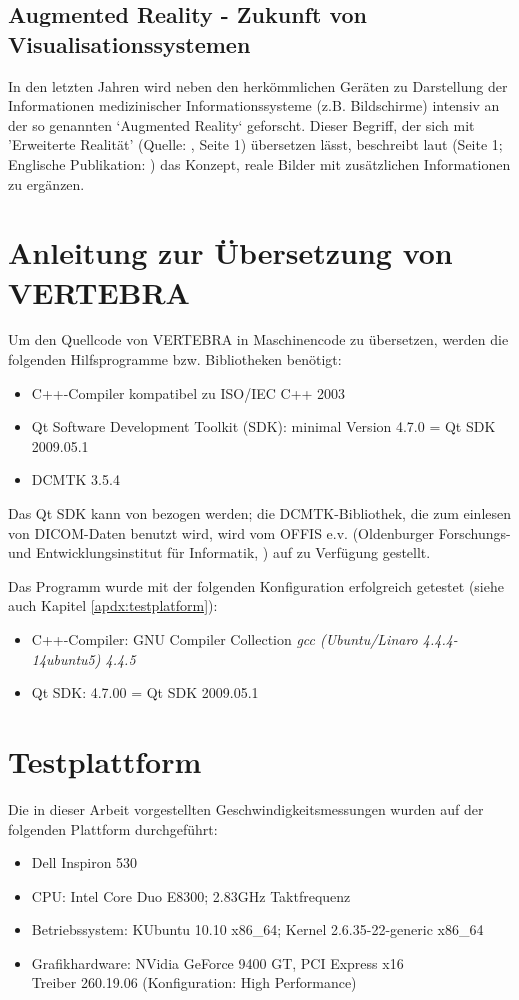 \documentclass[a4paper]{scrartcl}
\begin{document}
\subsection{Augmented Reality - Zukunft von Visualisationssystemen}\label{sec:augmentedreality}
In den letzten Jahren wird neben den herkömmlichen Geräten zu Darstellung der Informationen medizinischer Informationssysteme (z.B. Bildschirme) intensiv an der so genannten `Augmented Reality` geforscht. Dieser Begriff, der sich mit 'Erweiterte Realität' (Quelle: \cite{Toe2010}, Seite 1) übersetzen lässt, beschreibt laut \cite{Suthau2002DE} (Seite 1; Englische Publikation: \cite{Suthau2002}) das Konzept, reale Bilder mit zusätzlichen Informationen zu ergänzen. 
\appendix \label{appendixstart}
\section{Anleitung zur Übersetzung von VERTEBRA}
Um den Quellcode von VERTEBRA in Maschinencode zu übersetzen, werden die folgenden Hilfsprogramme bzw. Bibliotheken benötigt:
\begin{itemize}
 \item C++-Compiler kompatibel zu ISO/IEC C++ 2003
 \item Qt Software Development Toolkit (SDK): minimal Version 4.7.0 = Qt SDK 2009.05.1
 \item DCMTK 3.5.4
\end{itemize}

Das Qt SDK kann von \cite{QtWebsite} bezogen werden; die DCMTK-Bibliothek, die zum einlesen von DICOM-Daten benutzt wird, wird vom OFFIS e.v. (Oldenburger Forschungs- und Entwicklungsinstitut für Informatik, \cite{OFFISWebsite}) auf \cite{DCMTKWebsite} zu Verfügung gestellt.

Das Programm wurde mit der folgenden Konfiguration erfolgreich getestet (siehe auch Kapitel \vref{apdx:testplatform}):
\begin{itemize}
 \item C++-Compiler: GNU Compiler Collection \textit{gcc (Ubuntu/Linaro 4.4.4-14ubuntu5) 4.4.5}
 \item Qt SDK: 4.7.00 = Qt SDK 2009.05.1
\end{itemize}

\section{Testplattform}\label{apdx:testplatform}
Die in dieser Arbeit vorgestellten Geschwindigkeitsmessungen wurden auf der folgenden Plattform durchgeführt:
\begin{itemize}
  \item Dell Inspiron 530
  \item CPU: Intel\textsuperscript{\textregistered} Core Duo E8300; 2.83GHz Taktfrequenz
  \item Betriebssystem: KUbuntu 10.10 x86\_64; Kernel 2.6.35-22-generic x86\_64
  \item Grafikhardware: NVidia\textsuperscript{\textregistered} GeForce 9400 GT, PCI Express x16\\
	Treiber 260.19.06 (Konfiguration: High Performance)
\end{itemize}
\end{document}
